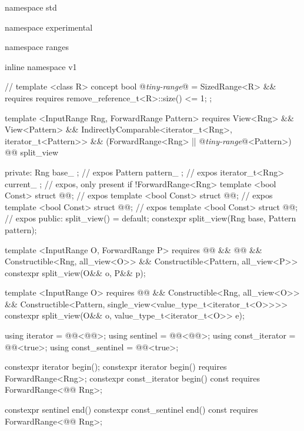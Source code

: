 \begin{codeblock}
namespace std { namespace experimental { namespace ranges { inline namespace v1 {
  // \expos
  template <class R>
  concept bool @\textit{tiny-range}@ =
    SizedRange<R> && requires {
      requires remove_reference_t<R>::size() <= 1;
    };

  template <InputRange Rng, ForwardRange Pattern>
    requires View<Rng> && View<Pattern> &&
        IndirectlyComparable<iterator_t<Rng>, iterator_t<Pattern>> &&
        (ForwardRange<Rng> || @\textit{tiny-range}@<Pattern>)
  @@ split_view {
  private:
    Rng base_ {}; // expos
    Pattern pattern_ {}; // expos
    iterator_t<Rng> current_ {}; // expos, only present if !ForwardRange<Rng>
    template <bool Const> struct @@; // expos
    template <bool Const> struct @@; // expos
    template <bool Const> struct @@; // expos
    template <bool Const> struct @@; // expos
  public:
    split_view() = default;
    constexpr split_view(Rng base, Pattern pattern);

    template <InputRange O, ForwardRange P>
      requires @@ &&
          @@ &&
          Constructible<Rng, all_view<O>> &&
          Constructible<Pattern, all_view<P>>
    constexpr split_view(O&& o, P&& p);

    template <InputRange O>
      requires @@ &&
          Constructible<Rng, all_view<O>> &&
          Constructible<Pattern, single_view<value_type_t<iterator_t<O>>>>
    constexpr split_view(O&& o, value_type_t<iterator_t<O>> e);

    using iterator = @@<@@>;
    using sentinel = @@<@@>;
    using const_iterator = @@<true>;
    using const_sentinel = @@<true>;

    constexpr iterator begin();
    constexpr iterator begin() requires ForwardRange<Rng>;
    constexpr const_iterator begin() const requires ForwardRange<@@ Rng>;

    constexpr sentinel end()
    constexpr const_sentinel end() const requires ForwardRange<@@ Rng>;

}}}}}
\end{codeblock}

